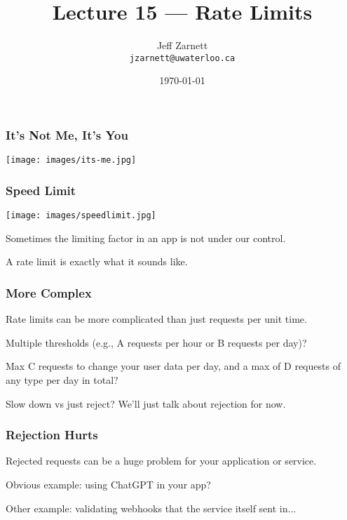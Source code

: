 


\title{Lecture 15 --- Rate Limits}

\author{Jeff Zarnett\\ \small \texttt{jzarnett@uwaterloo.ca}}
\date{\today}




\begin{frame}
  \titlepage
 \end{frame}
 
\begin{frame}
\frametitle{It's Not Me, It's You}

\begin{center}
  \texttt{[image: images/its-me.jpg]}
\end{center}

\end{frame}

\begin{frame}
\frametitle{Speed Limit}

\begin{center}
  \texttt{[image: images/speedlimit.jpg]}
\end{center}

Sometimes the limiting factor in an app is not under our control.

A rate limit is exactly what it sounds like.

\end{frame}

\begin{frame}
\frametitle{More Complex}

Rate limits can be more complicated than just requests per unit time. 

Multiple thresholds (e.g., A requests per hour or B requests per day)?

Max C requests to change your user data per day, and a max of D requests of any type per day in total?

Slow down vs just reject? We'll just talk about rejection for now.

\end{frame}

\begin{frame}
\frametitle{Rejection Hurts}

Rejected requests can be a huge problem for your application or service.

Obvious example: using ChatGPT in your app?

Other example: validating webhooks that the service itself sent in...

\end{frame}

